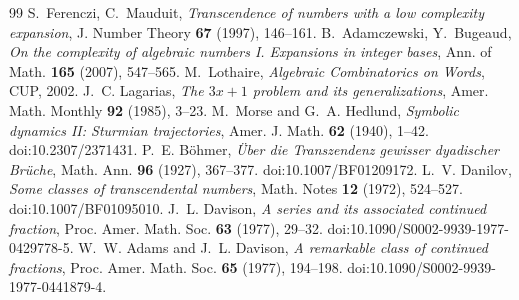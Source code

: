 \documentclass[11pt,a4paper]{article}
\theoremstyle{plain}
\theoremstyle{definition}
\begin{document}
\begin{thebibliography}{99}
 S.~Ferenczi, C.~Mauduit, \emph{Transcendence of numbers with a low complexity
expansion}, J. Number Theory \textbf{67} (1997), 146--161.
 B.~Adamczewski, Y.~Bugeaud, \emph{On the complexity of algebraic numbers I.
Expansions in integer bases}, Ann. of Math. \textbf{165} (2007), 547--565.
 M.~Lothaire, \emph{Algebraic Combinatorics on Words}, CUP, 2002.
 J.~C. Lagarias, \emph{The $3x+1$ problem and its generalizations},
Amer. Math. Monthly \textbf{92} (1985), 3--23.
 M.~Morse and G.~A. Hedlund, \emph{Symbolic dynamics II: Sturmian trajectories},
Amer. J. Math. \textbf{62} (1940), 1--42. doi:10.2307/2371431.
 P.~E. B\"ohmer, \emph{\"Uber die Transzendenz gewisser dyadischer Br\"uche},
Math. Ann. \textbf{96} (1927), 367--377. doi:10.1007/BF01209172.
 L.~V. Danilov, \emph{Some classes of transcendental numbers},
Math. Notes \textbf{12} (1972), 524--527. doi:10.1007/BF01095010.
 J.~L. Davison, \emph{A series and its associated continued fraction},
Proc. Amer. Math. Soc. \textbf{63} (1977), 29--32. doi:10.1090/S0002-9939-1977-0429778-5.
 W.~W. Adams and J.~L. Davison, \emph{A remarkable class of continued
fractions}, Proc. Amer. Math. Soc. \textbf{65} (1977), 194--198.
doi:10.1090/S0002-9939-1977-0441879-4.
\end{thebibliography}
\end{document}
